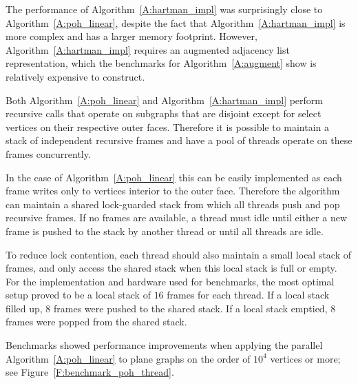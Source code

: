 \documentclass[12pt,letterpaper]{article}
\theoremstyle{plain}
\theoremstyle{definition}
\theoremstyle{break}
\begin{document}
The performance of
Algorithm~\ref{A:hartman_impl} was surprisingly close to
Algorithm~\ref{A:poh_linear}, despite the fact that
Algorithm~\ref{A:hartman_impl} is more complex and has a larger memory
footprint.
However, Algorithm~\ref{A:hartman_impl} requires an augmented adjacency list
representation, which the benchmarks for Algorithm~\ref{A:augment} show
is relatively expensive to construct.

Both Algorithm~\ref{A:poh_linear} and Algorithm~\ref{A:hartman_impl} perform
recursive calls that operate on
subgraphs that are disjoint except for select vertices on their
respective outer faces. Therefore it is possible to maintain a stack of
independent recursive frames and have a pool of threads operate on these frames
concurrently.

In the case of Algorithm~\ref{A:poh_linear} this can be easily implemented as
each frame writes only to vertices interior to the outer face. Therefore the
algorithm can maintain a shared lock-guarded stack from which
all threads push and pop recursive frames.
If no frames are
available, a thread must idle until either a new frame is pushed to the stack
by another thread or until
all threads are idle.

To reduce lock contention, each thread should also
maintain a
small local stack of frames, and only access the shared
stack when this local stack is full or empty.
For the implementation and hardware
used for benchmarks, the most optimal setup proved to be a
local stack of $16$ frames for each thread. If a local stack filled up,
$8$ frames were pushed to the
shared stack. If a local stack emptied, $8$ frames were popped from the
shared stack.

Benchmarks showed performance improvements when applying the
parallel Algorithm~\ref{A:poh_linear} to plane graphs on the order of $10^4$
vertices or more; see Figure~\ref{F:benchmark_poh_thread}.
\end{document}
